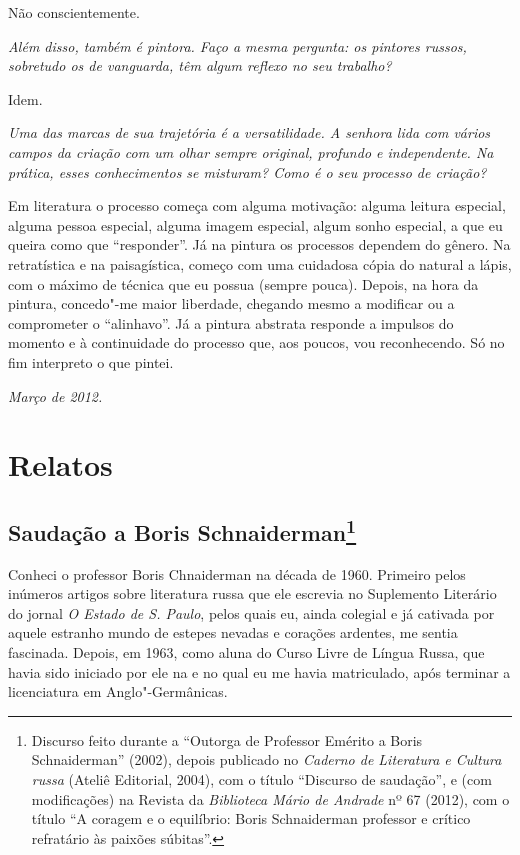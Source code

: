 {Não conscientemente.

\medskip

\emph{Além disso, também é pintora. Faço a mesma pergunta: os pintores
russos, sobretudo os de vanguarda, têm algum reflexo no seu trabalho?}

Idem.

\medskip

\emph{Uma das marcas de sua trajetória é a versatilidade. A senhora lida
com vários campos da criação com um olhar sempre original, profundo e
independente. Na prática, esses conhecimentos se misturam? Como é o seu
processo de criação?}

Em literatura o processo começa com alguma motivação: alguma leitura
especial, alguma pessoa especial, alguma imagem especial, algum sonho
especial, a que eu queira como que ``responder''. Já na pintura os
processos dependem do gênero. Na retratística e na paisagística, começo
com uma cuidadosa cópia do natural a lápis, com o máximo de técnica que
eu possua (sempre pouca). Depois, na hora da pintura, concedo"-me maior
liberdade, chegando mesmo a modificar ou a comprometer o ``alinhavo''.
Já a pintura abstrata responde a impulsos do momento e à continuidade do
processo que, aos poucos, vou reconhecendo. Só no fim interpreto o que
pintei.

\begin{flushright}
\emph{Março de 2012.}
\end{flushright}

\part{Relatos}

\chapter{Saudação a Boris Schnaiderman\footnote{Discurso feito durante a
  ``Outorga de Professor Emérito a Boris Schnaiderman'' (2002), depois
  publicado no \emph{Caderno de Literatura e Cultura russa} (Ateliê
  Editorial, 2004), com o título ``Discurso de saudação'', e (com
 modificações) na Revista da \emph{Biblioteca Mário de
  Andrade} nº 67 (2012), com o título ``A coragem e o equilíbrio: Boris
  Schnaiderman professor e crítico refratário às paixões súbitas''.}}

Conheci o professor Boris Chnaiderman na década de 1960. Primeiro pelos
inúmeros artigos sobre literatura russa que ele escrevia no Suplemento
Literário do jornal \emph{O Estado de S. Paulo}, pelos quais eu, ainda
colegial e já cativada por aquele estranho mundo de estepes nevadas e
corações ardentes, me sentia fascinada. Depois, em 1963, como aluna do
Curso Livre de Língua Russa, que havia sido iniciado por ele na  e no
qual eu me havia matriculado, após terminar a licenciatura em
Anglo"-Germânicas.

}
